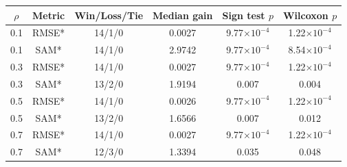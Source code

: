 \begin{tabular}{c c c c c c}
\toprule
$\rho$ & Metric & Win/Loss/Tie & Median gain & Sign test $p$ & Wilcoxon $p$ \\
\midrule
0.1 & RMSE* & 14/1/0 & 0.0027 & 9.77$\times 10^{-4}$ & 1.22$\times 10^{-4}$ \\
0.1 & SAM* & 14/1/0 & 2.9742 & 9.77$\times 10^{-4}$ & 8.54$\times 10^{-4}$ \\
0.3 & RMSE* & 14/1/0 & 0.0027 & 9.77$\times 10^{-4}$ & 1.22$\times 10^{-4}$ \\
0.3 & SAM* & 13/2/0 & 1.9194 & 0.007 & 0.004 \\
0.5 & RMSE* & 14/1/0 & 0.0026 & 9.77$\times 10^{-4}$ & 1.22$\times 10^{-4}$ \\
0.5 & SAM* & 13/2/0 & 1.6566 & 0.007 & 0.012 \\
0.7 & RMSE* & 14/1/0 & 0.0027 & 9.77$\times 10^{-4}$ & 1.22$\times 10^{-4}$ \\
0.7 & SAM* & 12/3/0 & 1.3394 & 0.035 & 0.048 \\
\bottomrule
\end{tabular}
